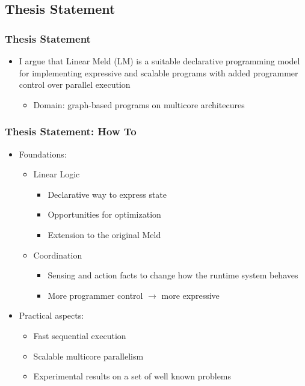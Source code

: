 \documentclass{beamer}
\begin{document}
\subsection{Thesis Statement}

\frame
{
   \frametitle{Thesis Statement}
   \begin{itemize}
      \item I argue that Linear Meld (LM) is a suitable declarative programming model for implementing expressive and scalable programs with added programmer control over parallel execution
      \begin{itemize}
         \item Domain: graph-based programs on multicore architecures
      \end{itemize}
   \end{itemize}
}   

\begin{frame}[fragile]
   \frametitle{Thesis Statement: How To}
   \begin{itemize}
      \item Foundations:
      \begin{itemize}
         \item Linear Logic
         \begin{itemize}
            \item Declarative way to express state
            \item Opportunities for optimization
            \item Extension to the original Meld
         \end{itemize}
         \item Coordination
         \begin{itemize}
            \item Sensing and action facts to change how the runtime system behaves
            \item More programmer control $\rightarrow$ more expressive
         \end{itemize}
      \end{itemize}
      \item Practical aspects:
      \begin{itemize}
         \item Fast sequential execution
         \item Scalable multicore parallelism
         \item Experimental results on a set of well known problems
      \end{itemize}
   \end{itemize}
\end{frame}
\end{document}
